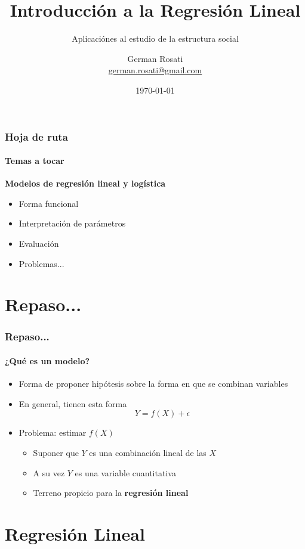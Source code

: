 \documentclass{beamer}
\title[Metodología Cuantitativa II]{Introducción a la Regresión Lineal}
\subtitle{Aplicaciónes al estudio de la estructura social}
\author{German Rosati \\  \href{ german.rosati@gmail.com}{german.rosati@gmail.com}}
\institute{UNTREF - UNSAM - CONICET}
\date{\today}
\begin{document}
\frame{\titlepage}

\begin{frame}
\frametitle{Hoja de ruta}
\framesubtitle{Temas a tocar}
\textbf{Modelos de regresión lineal y logística}
	\begin{itemize}
		\item Forma funcional
		\item Interpretación de parámetros
		\item Evaluación
		\item Problemas...
	\end{itemize}	
\end{frame}

\section{Repaso...}
\begin{frame}
\frametitle{Repaso... }
\framesubtitle{¿Qué es un modelo?}
	\begin{itemize}
		\item Forma de proponer hipótesis sobre la forma en que se combinan variables
		\item En general, tienen esta forma 
			\begin{equation}
				Y = f(X) + \epsilon
			\end{equation}
		\item Problema: estimar $f(X)$
		\begin{itemize}
			\item Suponer que $Y$ es una combinación lineal de las $X$ 
			\item A su vez $Y$ es una variable cuantitativa
			\item Terreno propicio para la \textbf{regresión lineal}
		\end{itemize}
	\end{itemize}
\end{frame}


\section{Regresión Lineal}
\end{document}
